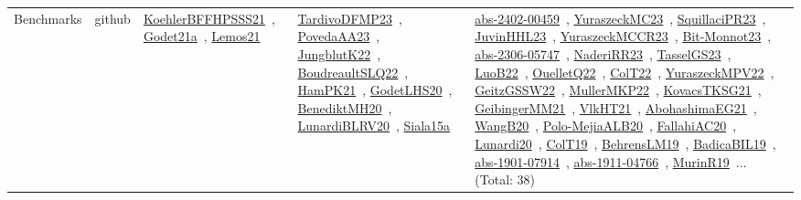 {\begin{longtable}{lp{3cm}>{\raggedright\arraybackslash}p{6cm}>{\raggedright\arraybackslash}p{6cm}>{\raggedright\arraybackslash}p{8cm}}
Benchmarks & github & \href{works/KoehlerBFFHPSSS21.pdf}{KoehlerBFFHPSSS21}~\cite{KoehlerBFFHPSSS21}, \href{works/Godet21a.pdf}{Godet21a}~\cite{Godet21a}, \href{works/Lemos21.pdf}{Lemos21}~\cite{Lemos21} & \href{works/TardivoDFMP23.pdf}{TardivoDFMP23}~\cite{TardivoDFMP23}, \href{works/PovedaAA23.pdf}{PovedaAA23}~\cite{PovedaAA23}, \href{works/JungblutK22.pdf}{JungblutK22}~\cite{JungblutK22}, \href{works/BoudreaultSLQ22.pdf}{BoudreaultSLQ22}~\cite{BoudreaultSLQ22}, \href{works/HamPK21.pdf}{HamPK21}~\cite{HamPK21}, \href{works/GodetLHS20.pdf}{GodetLHS20}~\cite{GodetLHS20}, \href{works/BenediktMH20.pdf}{BenediktMH20}~\cite{BenediktMH20}, \href{works/LunardiBLRV20.pdf}{LunardiBLRV20}~\cite{LunardiBLRV20}, \href{works/Siala15a.pdf}{Siala15a}~\cite{Siala15a} & \href{works/abs-2402-00459.pdf}{abs-2402-00459}~\cite{abs-2402-00459}, \href{works/YuraszeckMC23.pdf}{YuraszeckMC23}~\cite{YuraszeckMC23}, \href{works/SquillaciPR23.pdf}{SquillaciPR23}~\cite{SquillaciPR23}, \href{works/JuvinHHL23.pdf}{JuvinHHL23}~\cite{JuvinHHL23}, \href{works/YuraszeckMCCR23.pdf}{YuraszeckMCCR23}~\cite{YuraszeckMCCR23}, \href{works/Bit-Monnot23.pdf}{Bit-Monnot23}~\cite{Bit-Monnot23}, \href{works/abs-2306-05747.pdf}{abs-2306-05747}~\cite{abs-2306-05747}, \href{works/NaderiRR23.pdf}{NaderiRR23}~\cite{NaderiRR23}, \href{works/TasselGS23.pdf}{TasselGS23}~\cite{TasselGS23}, \href{works/LuoB22.pdf}{LuoB22}~\cite{LuoB22}, \href{works/OuelletQ22.pdf}{OuelletQ22}~\cite{OuelletQ22}, \href{works/ColT22.pdf}{ColT22}~\cite{ColT22}, \href{works/YuraszeckMPV22.pdf}{YuraszeckMPV22}~\cite{YuraszeckMPV22}, \href{works/GeitzGSSW22.pdf}{GeitzGSSW22}~\cite{GeitzGSSW22}, \href{works/MullerMKP22.pdf}{MullerMKP22}~\cite{MullerMKP22}, \href{works/KovacsTKSG21.pdf}{KovacsTKSG21}~\cite{KovacsTKSG21}, \href{works/GeibingerMM21.pdf}{GeibingerMM21}~\cite{GeibingerMM21}, \href{works/VlkHT21.pdf}{VlkHT21}~\cite{VlkHT21}, \href{works/AbohashimaEG21.pdf}{AbohashimaEG21}~\cite{AbohashimaEG21}, \href{works/WangB20.pdf}{WangB20}~\cite{WangB20}, \href{works/Polo-MejiaALB20.pdf}{Polo-MejiaALB20}~\cite{Polo-MejiaALB20}, \href{works/FallahiAC20.pdf}{FallahiAC20}~\cite{FallahiAC20}, \href{works/Lunardi20.pdf}{Lunardi20}~\cite{Lunardi20}, \href{works/ColT19.pdf}{ColT19}~\cite{ColT19}, \href{works/BehrensLM19.pdf}{BehrensLM19}~\cite{BehrensLM19}, \href{works/BadicaBIL19.pdf}{BadicaBIL19}~\cite{BadicaBIL19}, \href{works/abs-1901-07914.pdf}{abs-1901-07914}~\cite{abs-1901-07914}, \href{works/abs-1911-04766.pdf}{abs-1911-04766}~\cite{abs-1911-04766}, \href{works/MurinR19.pdf}{MurinR19}~\cite{MurinR19}... (Total: 38)\\

\end{longtable}}
